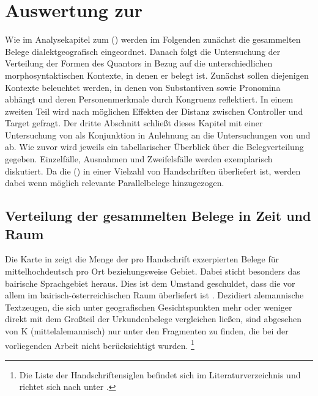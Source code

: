 \chapter{Auswertung zur }
\label{ch:kcanalyse}

Wie im Analysekapitel zum  (\CAO)
werden im Folgenden zunächst die gesammelten Belege dialektgeografisch
eingeordnet. Danach folgt die Untersuchung der Verteilung der Formen des
Quantors  in Bezug auf die unterschiedlichen morphosyntaktischen
Kontexte, in denen er belegt ist. Zunächst sollen diejenigen Kontexte
beleuchtet werden, in denen  von Substantiven sowie Pronomina
abhängt und deren Personenmerkmale durch Kongruenz reflektiert. In einem
zweiten Teil wird nach möglichen Effekten der Distanz zwischen Controller und
Target gefragt. Der dritte Abschnitt schließt dieses Kapitel mit einer
Untersuchung von  als Konjunktion in Anlehnung an die
Untersuchungen von \citet{askedal1974} und \citet{gjelsten1980} ab. Wie zuvor
wird jeweils ein tabellarischer Überblick über die Belegverteilung gegeben.
Einzelfälle, Ausnahmen und Zweifelsfälle werden exemplarisch diskutiert. Da die
 (\KC{}) in einer Vielzahl von Handschriften überliefert
ist, werden dabei wenn möglich relevante Parallelbelege hinzugezogen.

\section{Verteilung der gesammelten Belege in Zeit und Raum}
\label{subsec:beiddispmap}

Die Karte in  zeigt die Menge der pro Handschrift
exzerpierten Belege für mittelhochdeutsch 
pro Ort beziehungsweise Gebiet. Dabei sticht besonders das
bairische Sprachgebiet heraus. Dies ist dem Umstand
geschuldet, dass die \KC{} vor allem im
bairisch-österreichischen Raum überliefert ist
\autocite{klein1988}. Dezidiert alemannische
Textzeugen, die sich unter geografischen Gesichtspunkten mehr oder weniger
direkt mit dem Großteil der Urkundenbelege vergleichen ließen, sind abgesehen
von K (mittelalemannisch) nur unter den Fragmenten
zu finden, die bei der vorliegenden Arbeit nicht berücksichtigt wurden.%
%
	\footnote{Die Liste der Handschriftensiglen befindet sich im
		Literaturverzeichnis und richtet sich nach  unter
		.%
	}

